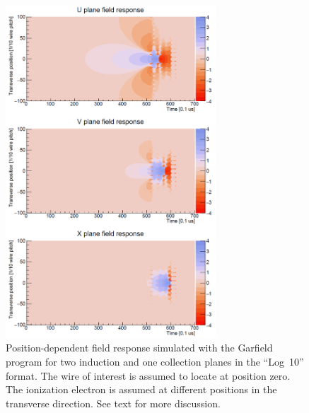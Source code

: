  \begin{figure}[!htp]
  \centering
  \includegraphics[width=0.7\textwidth]{graphics/field_response_data.png}
\caption[Position-dependent field response simulated with the Garfield program]{Position-dependent field response simulated with the Garfield program 
for two induction and one collection planes in the ``Log~10'' format. The wire of interest 
is assumed to locate at position zero. The ionization electron is assumed at different
positions in the transverse direction. See text for more discussion.}
\label{field_resp}
\end{figure}

